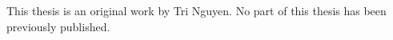 \documentclass[12pt,twoside]{report}
\begin{document}

\begin{preface}
This thesis is an original work by Tri Nguyen. No part of this thesis has been previously published. 
\end{preface}
\newpage

\tableofcontents
\newpage
{}
\listoffigures
\newpage




\renewcommand{\thepage}{}










 \clearpage %


\end{document}
